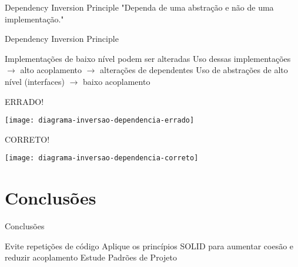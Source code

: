 \documentclass{beamer}
\begin{document}
\begin{frame}{Dependency Inversion Principle}
 "Dependa de uma abstração e não de uma implementação."
\end{frame}

\begin{frame}{Dependency Inversion Principle}
 \begin{outline}
   Implementações de baixo nível podem ser alteradas
   Uso dessas implementações $\rightarrow$ alto acoplamento $\rightarrow$ alterações de dependentes
   Uso de abstrações de alto nível (interfaces) $\rightarrow$ baixo acoplamento
 \end{outline}
\end{frame}

\begin{frame}{ERRADO!}
  \begin{center}
    \texttt{[image: diagrama-inversao-dependencia-errado]}
  \end{center}
\end{frame}

\begin{frame}{CORRETO!}
  \begin{center}
    \texttt{[image: diagrama-inversao-dependencia-correto]}
  \end{center}
\end{frame}

\section{Conclusões}

\begin{frame}{Conclusões}
  \begin{outline}
     Evite \alert{repetições} de código
     Aplique os princípios SOLID para \alert{aumentar coesão} e \alert{reduzir acoplamento}
     Estude \alert{Padrões de Projeto}
  \end{outline}
\end{frame}
\end{document}
